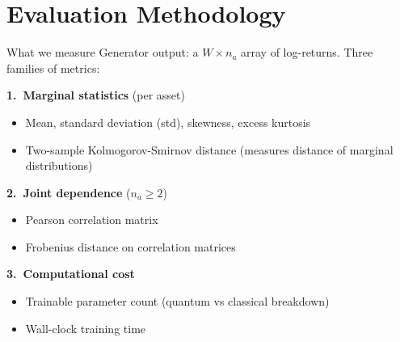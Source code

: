 
\section{Evaluation Methodology}
\label{sec:evaluation}
\frame[plain]{\sectionpage}

\begin{frame}{What we measure}
    Generator output: a $W \times n_a$ array of log-returns.
    Three families of metrics:
    \medskip

    \textbf{1.\ Marginal statistics} (per asset)
    \begin{itemize}
        \item Mean, standard deviation (std), skewness, excess kurtosis
        \item Two-sample Kolmogorov-Smirnov distance (measures distance of marginal distributions)
    \end{itemize}
    \medskip

    \textbf{2.\ Joint dependence} ($n_a \geq 2$)
    \begin{itemize}
        \item Pearson correlation matrix
        \item Frobenius distance on correlation matrices
    \end{itemize}
    \medskip

    \textbf{3.\ Computational cost}
    \begin{itemize}
        \item Trainable parameter count (quantum vs classical
        breakdown)
        \item Wall-clock training time
    \end{itemize}
\end{frame}

